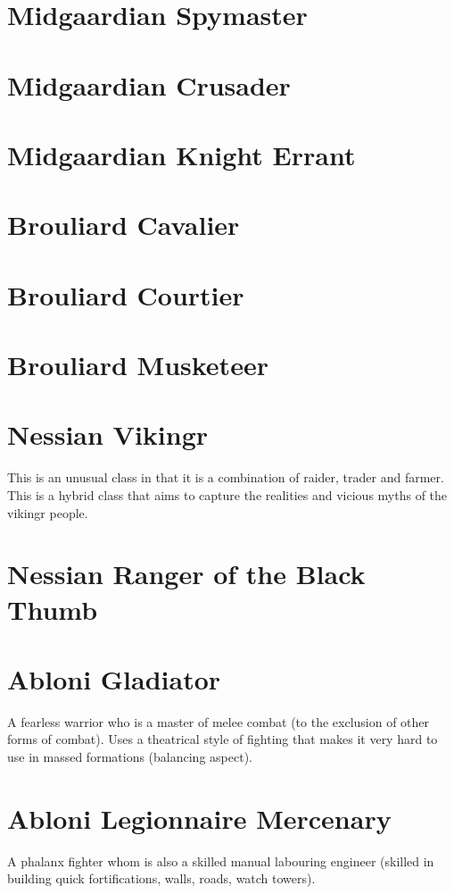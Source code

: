 
\section{Midgaardian Spymaster} 
\section{Midgaardian Crusader}
\section{Midgaardian Knight Errant}
\section{Brouliard Cavalier}
\section{Brouliard Courtier}
\section{Brouliard Musketeer}
\section{Nessian Vikingr} This is an unusual class in that it is a combination of raider, trader and farmer. This is a hybrid class that aims to capture the realities and vicious myths of the vikingr people. 
\section{Nessian Ranger of the Black Thumb}
\section{Abloni Gladiator} A fearless warrior who is a master of melee combat (to the exclusion of other forms of combat). Uses a theatrical style of fighting that makes it very hard to use in massed formations (balancing aspect).
\section{Abloni Legionnaire Mercenary} A phalanx fighter whom is also a skilled manual labouring engineer (skilled in building quick fortifications, walls, roads, watch towers).
